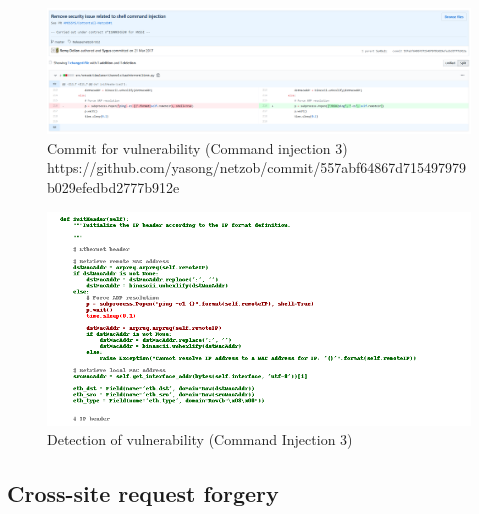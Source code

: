 \documentclass[
a4paper,
pagesize,
pdftex,
12pt,
twoside, %
BCOR=5mm, %
ngerman,
fleqn,
final,
]{scrartcl}
\begin{document}
		
		\begin{figure}[H]
			\centering
			\includegraphics[width=\linewidth]{Images/command_injectionC}
			\caption{Commit for vulnerability (Command injection 3) \newline \scriptsize{https://github.com/yasong/netzob/commit/557abf64867d715497979b029efedbd2777b912e}}
			\label{fig:command_injectionC}
		\end{figure}
		\begin{figure}[H]
			\centering
			\includegraphics[width=\linewidth]{Images/command_injectionCr}
			\caption{Detection of vulnerability (Command Injection 3)}
			\label{fig:command_injectionCr}
		\end{figure}
		
		
		
	
	
	
	\subsection{Cross-site request forgery}
	
\end{document}
